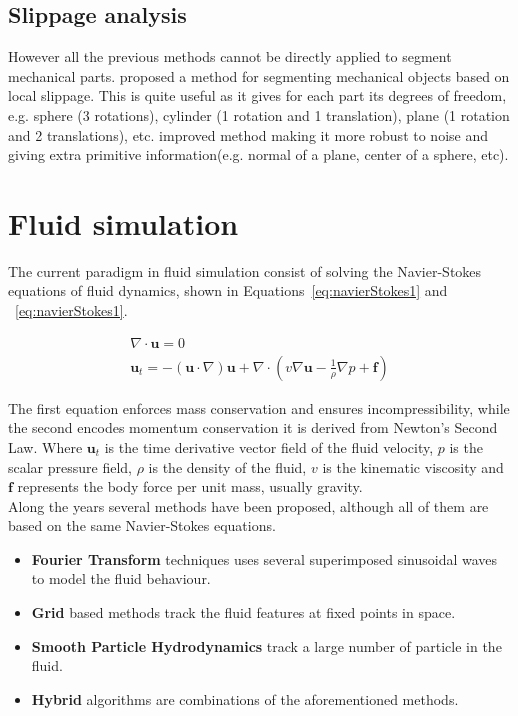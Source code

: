 \subsection{Slippage analysis}
\label{SlippageAnalysis}

However all the previous methods cannot be directly applied to segment mechanical parts.
\cite{Gelfand2004} proposed a method for segmenting mechanical objects based on local slippage.
This is quite useful as it gives for each part its degrees of freedom, e.g. sphere (3 rotations), cylinder (1 rotation and 1 translation), plane (1 rotation and 2 translations), etc.
\cite{Yi2014} improved \cite{Gelfand2004} method making it more robust to noise and giving extra primitive information(e.g. normal of a plane, center of a sphere, etc).

\section{Fluid simulation}
\label{prevWorkFluidSim}

The current paradigm in fluid simulation consist of solving the Navier-Stokes equations of fluid dynamics, shown in Equations~\ref{eq:navierStokes1} and  ~\ref{eq:navierStokes1}.

\begin{gather}
\label{eq:navierStokes1}
\nabla \cdot \mathbf{u} = 0\\
\label{eq:navierStokes2}
\mathbf{u}_t = -(\mathbf{u} \cdot \nabla)\mathbf{u} + \nabla \cdot ( v \nabla \mathbf{u} - \frac{1}{\rho} \nabla p + \mathbf{f} )
\end{gather}

The first equation enforces mass conservation and ensures incompressibility, while the second encodes momentum conservation it is derived from Newton's Second Law.
Where $\mathbf{u}_t$ is the time derivative vector field of the fluid velocity, $p$  is the scalar pressure field, $\rho$ is the density of the fluid, $v$ is the kinematic viscosity and $\mathbf{f}$ represents the body force per unit mass, usually gravity.\\

Along the years several methods have been proposed, although all of them are based on the same Navier-Stokes equations.

\begin{itemize}
\item \textbf{Fourier Transform} techniques uses several superimposed sinusoidal waves to model the fluid behaviour.
\item \textbf{Grid} based methods track the fluid features at fixed points in space.
\item \textbf{Smooth Particle Hydrodynamics} track a large number of particle in the fluid.
\item \textbf{Hybrid} algorithms are combinations of the aforementioned methods.\\
\end{itemize}

